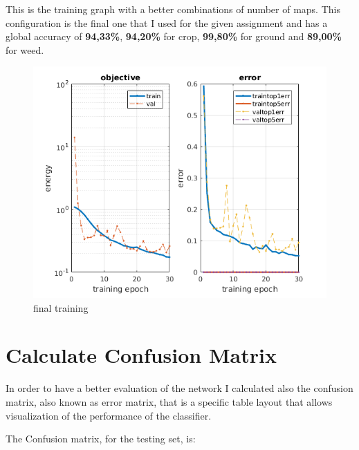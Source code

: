 \documentclass[]{report}
\begin{document}
\newpage   
This is the training graph with a better combinations of number of maps. This configuration is the final one that I used for the given assignment and has a global accuracy of \textbf{94,33\%}, \textbf{94,20\%} for crop, \textbf{99,80\%} for ground and \textbf{89,00\%} for weed.

\begin{figure}[h]
	\begin{center}
		\includegraphics[scale=0.5]{final.png}
		\caption{final training}
		\label{fig:FinalTraining}
	\end{center}
\end{figure}
\newpage

\section{Calculate Confusion Matrix}

In order to have a better evaluation of the network I calculated also the confusion matrix, also known as error matrix, that is a specific table layout that allows visualization of the performance of the classifier.

The Confusion matrix, for the testing set, is:
\end{document}
